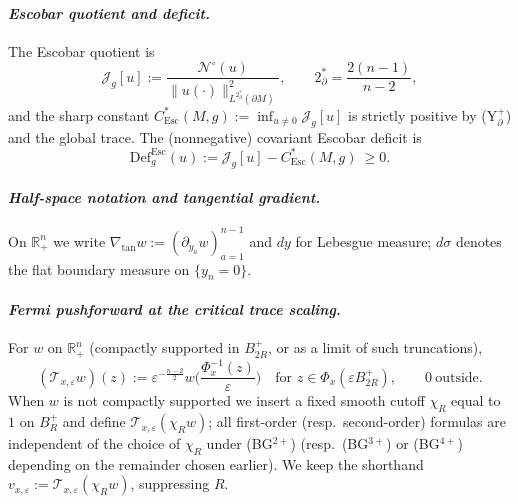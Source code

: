 \documentclass[11pt,reqno,a4paper]{amsart}
\newcommand{\R}{\mathbb{R}}
\numberwithin{equation}{section}
\newcommand{\Def}{\mathrm{Def}}
\theoremstyle{plain}
\newcommand{\Esc}{\ensuremath{\mathrm{Esc}}}
\theoremstyle{remark}
\theoremstyle{plain}
\begin{document}
\paragraph{\emph{Escobar quotient and deficit.}}
The Escobar quotient is
\[
\mathcal J_g[u]:=\frac{\mathcal N^\circ(u)}{\|u(\cdot)\|_{L^{2^*_\partial}(\partial M)}^2},\qquad
2^*_\partial=\frac{2(n-1)}{n-2},
\]
and the sharp constant $C^*_{\Esc}(M,g):=\inf_{u\ne 0}\mathcal J_g[u]$ is strictly positive by \textup{(Y$^+_{\partial}$)} and the global trace. The (nonnegative) covariant Escobar deficit is
\[
\Def^{\Esc}_g(u):=\mathcal J_g[u]-C^*_{\Esc}(M,g)\ \ge 0.
\]

\paragraph{\emph{Half-space notation and tangential gradient.}}
On $\R^n_+$ we write $\nabla_{\tan}w:=(\partial_{y_a}w)_{a=1}^{n-1}$ and $dy$ for Lebesgue measure; $d\sigma$ denotes the flat boundary measure on $\{y_n=0\}$.
\medskip
\paragraph{\emph{Fermi pushforward at the critical trace scaling.}}
For $w$ on $\R^n_+$ (compactly supported in $B_{2R}^+$, or as a limit of such truncations),
\[
(\mathcal T_{x,\varepsilon}w)(z)
:=\varepsilon^{-\frac{n-2}{2}}w\Big(\frac{\Phi_x^{-1}(z)}{\varepsilon}\Big)\quad
\text{for }z\in \Phi_x(\varepsilon B_{2R}^+),\qquad 0\ \text{outside}.
\]
When $w$ is not compactly supported we insert a fixed smooth cutoff $\chi_R$ equal to $1$ on $B_R^+$ and define $\mathcal T_{x,\varepsilon}(\chi_R w)$; all first-order (resp.\ second-order) formulas are independent of the choice of $\chi_R$ under \textup{(BG$^{2+}$)} (resp.\ \textup{(BG$^{3+}$)} or \textup{(BG$^{4+}$)} depending on the remainder chosen earlier). We keep the shorthand $v_{x,\varepsilon}:=\mathcal T_{x,\varepsilon}(\chi_R w)$, suppressing $R$.
\medskip
\end{document}
